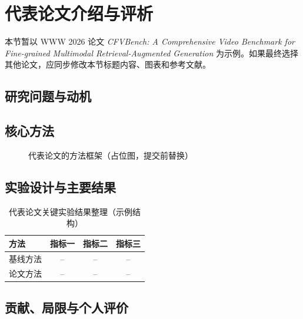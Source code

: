 \section{代表论文介绍与评析}


本节暂以 WWW 2026 论文 \emph{CFVBench: A Comprehensive Video Benchmark for Fine-grained Multimodal Retrieval-Augmented Generation} 为示例\parencite{wei2026cfvbench}。如果最终选择其他论文，应同步修改本节标题内容、图表和参考文献。

\subsection{研究问题与动机}


\subsection{核心方法}


\ifdraftmode
\begin{figure}[htbp]
  \centering
  \caption{代表论文的方法框架（占位图，提交前替换）}
  \label{fig:method-overview}
\end{figure}
\fi

\subsection{实验设计与主要结果}


\begin{table}[htbp]
  \centering
  \caption{代表论文关键实验结果整理（示例结构）}
  \label{tab:main-results}
  \begin{tabular}{lccc}
    \toprule
    方法 & 指标一 & 指标二 & 指标三 \\
    \midrule
    基线方法 & -- & -- & -- \\
    论文方法 & -- & -- & -- \\
    \bottomrule
  \end{tabular}
\end{table}

\subsection{贡献、局限与个人评价}

